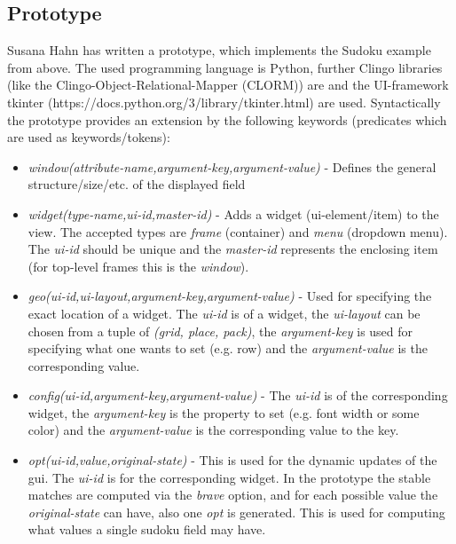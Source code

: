 \documentclass[12pt,a4paper]{article}
\newcommand{\<}[1]{\guilsinglleft}
\renewcommand{\>}[1]{\guilsinglright}
\begin{document}
\subsection{Prototype}

\noindent Susana Hahn has written a prototype, which implements the Sudoku example from above. The used programming language is Python, further Clingo libraries (like the Clingo-Object-Relational-Mapper (CLORM)) are and the UI-framework tkinter (https://docs.python.org/3/library/tkinter.html) are used. Syntactically the prototype provides an extension by the following keywords (predicates which are used as keywords/tokens):

\begin{itemize}
    \item \textit{window(\< aattribute-name\> ,,\< aargument-key\>,,\<aargument-value\>))} - Defines the general structure/size/etc. of the displayed field
    \item \textit{widget(\< ttype-name\>,,\<uui-id\>,,\<mmaster-id\>))} - Adds a widget (ui-element/item) to the view. The accepted types are \textit{frame} (container) and \textit{menu} (dropdown menu). The \textit{ui-id} should be unique and the \textit{master-id} represents the enclosing item (for top-level frames this is the \textit{window}).
    \item \textit{geo(\<uui-id\>,,\<uui-layout\>,,\<aargument-key\>,,\<aargument-value\>))} - Used for specifying the exact location of a widget. The \textit{ui-id} is of a widget, the \textit{ui-layout} can be chosen from a tuple of \textit{(grid, place, pack)}, the \textit{argument-key} is used for specifying what one wants to set (e.g. row) and the \textit{argument-value} is the corresponding value.
    \item \textit{config(\<uui-id\>,,\<aargument-key\>,,\<aargument-value\>))} - The \textit{ui-id} is of the corresponding widget, the \textit{argument-key} is the property to set (e.g. font width or some color) and the \textit{argument-value} is the corresponding value to the key.
    \item \textit{opt(\<uui-id\>,,\<vvalue\>,,\<ooriginal-state\>))} - This is used for the dynamic updates of the gui. The \textit{ui-id} is for the corresponding widget. In the prototype the stable matches are computed via the \textit{brave} option, and for each possible value the \textit{original-state} can have, also one \textit{opt} is generated. This is used for computing what values a single sudoku field may have.
\end{itemize}
\end{document}

